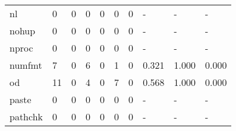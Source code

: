 \begin{longtable}{lp{2.0cm}p{2.0cm}p{2.0cm}p{2.0cm}p{2.0cm}p{2.0cm}p{2.0cm}p{2.0cm}p{2.0cm}}
nl        &                      0 &                                  0 &                                 0 &                                0 &                                 0 &                               0 &                                    - &                                      - &                                    - \\
nohup     &                      0 &                                  0 &                                 0 &                                0 &                                 0 &                               0 &                                    - &                                      - &                                    - \\
nproc     &                      0 &                                  0 &                                 0 &                                0 &                                 0 &                               0 &                                    - &                                      - &                                    - \\
numfmt    &                      7 &                                  0 &                                 6 &                                0 &                                 1 &                               0 &                                0.321 &                                  1.000 &                                0.000 \\
od        &                     11 &                                  0 &                                 4 &                                0 &                                 7 &                               0 &                                0.568 &                                  1.000 &                                0.000 \\
paste     &                      0 &                                  0 &                                 0 &                                0 &                                 0 &                               0 &                                    - &                                      - &                                    - \\
pathchk   &                      0 &                                  0 &                                 0 &                                0 &                                 0 &                               0 &                                    - &                                      - &                                    - \\

\end{longtable}

